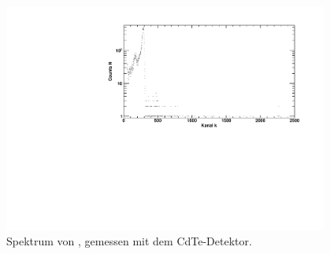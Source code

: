 \begin{figure}[H]
\begin{center}
  \includegraphics[width=0.95\textwidth]{../img/part3/Am-CdTe_spectrum.pdf}
  \caption{Spektrum von \am, gemessen mit dem CdTe-Detektor.}
  \label{img:cdte:am:spektrum}
\end{center}
\end{figure}


